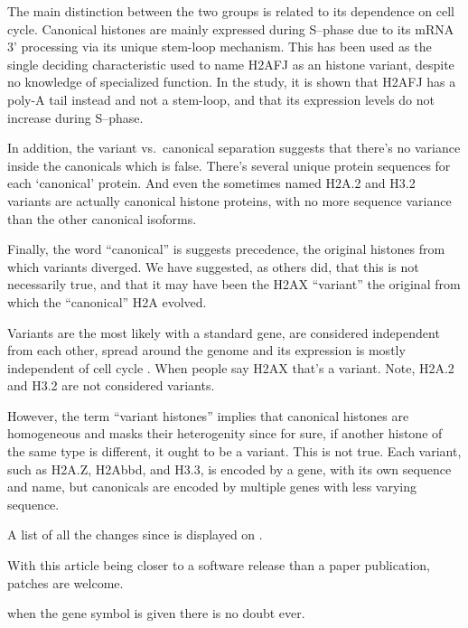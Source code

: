   The main distinction between the two groups is related to its dependence on
  cell cycle. Canonical histones are mainly expressed during S--phase due to
  its mRNA 3' processing via its unique stem-loop mechanism. This has been used
  as the single deciding characteristic used to name H2AFJ as an histone variant,
  despite no knowledge of specialized function\citep{h2afj-report}. In the study,
  it is shown that H2AFJ has a poly-A tail instead and not a stem-loop, and that
  its expression levels do not increase during S--phase.


  In addition, the variant vs.~canonical separation suggests that there's no variance inside
  the canonicals which is false. There's several unique protein sequences for each
  `canonical' protein. And even the sometimes named H2A.2 and H3.2 variants are actually
  canonical histone proteins, with no more sequence variance than the other canonical
  isoforms.


  Finally, the word ``canonical'' is suggests precedence, the original histones
  from which variants diverged. We have suggested, as others did, that this
  is not necessarily true, and that it may have been the H2AX ``variant'' the
  original from which the ``canonical'' H2A evolved\citep{our-H2AX-review, henikoff2010-variants-evolution}.


  Variants are the most likely with a standard gene, are considered independent from each other,
  spread around the genome and its expression is mostly independent of cell cycle . When people say H2AX that's
  a variant. Note, H2A.2 and H3.2 are not considered variants.


  However, the term ``variant histones'' implies that canonical histones are
  homogeneous and masks their heterogenity since for sure, if another histone
  of the same type is different, it ought to be a variant. This is not
  true. Each variant, such as H2A.Z, H2Abbd, and H3.3,
  is encoded by a gene, with its own sequence and name,
  but canonicals are encoded by multiple genes with less varying sequence.


  A list of all the changes since \cite{Marzluff02} is 
  displayed on .

  With this article being closer to a software release than a paper publication,
  patches are welcome.


  when the gene
  symbol is given there is no doubt ever.

